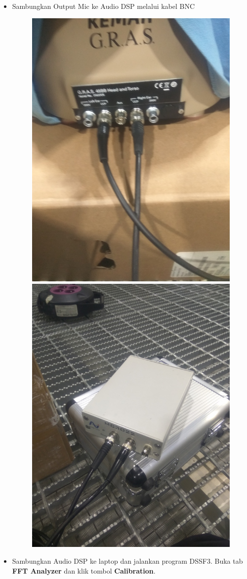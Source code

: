 \documentclass[12pt,]{article}
\begin{document}
\begin{itemize}
		\item Sambungkan Output Mic ke Audio DSP melalui kabel BNC
		\begin{figure}[H]
			\centering
			\includegraphics[width=0.3\linewidth]{day_1/wiring0}
			\includegraphics[width=0.3\linewidth]{day_1/wiring1}
		\end{figure}
	
		\item Sambungkan Audio DSP ke laptop dan jalankan program DSSF3.
		Buka tab \textbf{FFT Analyzer} dan klik tombol \textbf{Calibration}. 


\end{itemize}
\end{document}

